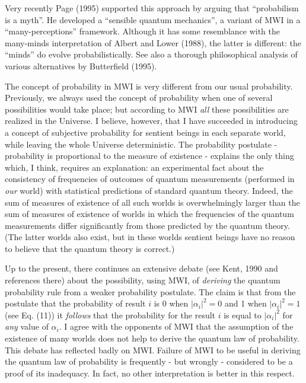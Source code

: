 Very recently Page (1995)  supported this approach by arguing  that
``probabilism is a myth''. He developed a ``sensible quantum
mechanics'', a variant of MWI in a ``many-perceptions'' framework.
Although it has some resemblance with the many-minds interpretation of
Albert and Lower (1988), the latter is different: the
``minds'' do evolve probabilistically. See also a thorough
philosophical analysis of various alternatives by
Butterfield (1995).

        

The concept of probability in MWI is very different from our usual
probability.  Previously, we always used the concept of probability
when one of several possibilities would take place; but according to
MWI {\it all} these possibilities are realized in the Universe.  I
believe, however, that I have succeeded in introducing a concept of
subjective probability for sentient beings in each separate world,
while leaving the whole Universe deterministic.  The probability
postulate - probability is proportional to the measure of existence -
explains the only thing which, I think, requires an explanation: an
experimental fact about the consistency of frequencies of outcomes of
quantum measurements (performed in {\it our} world) with statistical
predictions of standard quantum theory.  Indeed, the sum of measures
of existence of all such worlds is overwhelmingly larger than the sum
of measures of existence of worlds in which the frequencies of the
quantum measurements differ significantly from those predicted by the
quantum theory.  (The latter worlds also exist, but in these worlds
sentient beings have no reason to believe that the quantum theory is
correct.)

Up to the present, there continues an extensive debate (see Kent, 1990
and references there) about the possibility, using MWI, of {\it
  deriving} the quantum probability rule from a weaker probability
postulate.  The claim is that from the postulate that the probability
of result $i$ is 0 when $|\alpha_i|^2 = 0$ and 1 when $|\alpha_i|^2 =
1$ (see Eq.  (11)) it {\it follows} that the probability for the
result $i$ is equal to $|\alpha_i|^2 $ for {\it any} value of
$\alpha_i$.  I agree with the opponents of MWI that the assumption of
the existence of many worlds does not help to derive the quantum law
of probability.  This debate has reflected badly on MWI. Failure of
MWI to be useful in deriving the quantum law of probability is
frequently - but wrongly - considered to be a proof of its inadequacy.
In fact, no other interpretation is better in this respect.
 

